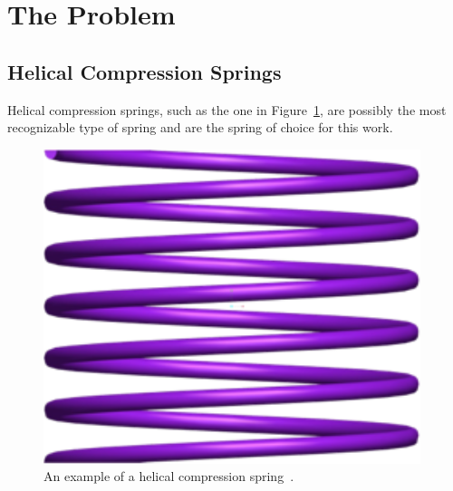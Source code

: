 \documentclass[10pt]{article}
\begin{document}
			
\section{The Problem} 
\label{sec:The_Problem}

\subsection{Helical Compression Springs}
\label{sec:Springs}

Helical compression springs, such as the one in Figure~\ref{fig:Spring}, are possibly the most recognizable type of spring and are the spring of choice for this work. 

		\begin{figure}[h]
		 \begin{center}\includegraphics[scale=.2]{Spring.png}\end{center}
		 \caption{An example of a helical compression spring~\cite{Massad2015}.}
		 \label{fig:Spring}
		 
		 \end{figure}
\end{document}
